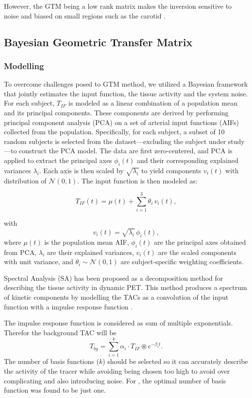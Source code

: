 However, the GTM being a low rank matrix makes the inversion sensitive to noise and biased on small regions such as the carotid \cite{zanotti2011image, boellaard2004effects}.

\subsection{Bayesian Geometric Transfer Matrix}
\subsubsection{Modelling}
To overcome challenges posed to GTM method, we utilized a Bayesian framework that jointly estimates the input function, the tissue activity and the system noise\cite{irace2021bayesian}.
For each subject, $T_{IF}$ is modeled as a linear combination of a population mean and its principal components.
These components are derived by performing principal component analysis (PCA) on a set of arterial input functions (AIFs) collected from the population.
Specifically, for each subject, a subset of 10 random subjects is selected from the dataset—excluding the subject under study—to construct the PCA model.
The data are first zero-centered, and PCA is applied to extract the principal axes \(\phi_i(t)\) and their corresponding explained variances \(\lambda_i\).
Each axis is then scaled by \(\sqrt{\lambda_i}\) to yield components \(v_i(t)\) with distribution of \(\mathcal{N}(0,1)\). The input function is then modeled as:

\begin{equation}
	T_{IF}(t) = \mu(t) + \sum_{i=1}^3 \theta_i\,v_i(t),
\end{equation}

with
\[
	v_i(t) = \sqrt{\lambda_i}\,\phi_i(t),
\]
where \(\mu(t)\) is the population mean AIF, \(\phi_i(t)\) are the principal axes obtained from PCA, \(\lambda_i\) are their explained variances, \(v_i(t)\) are the scaled components with unit variance, and \(\theta_i \sim \mathcal{N}(0,1)\) are subject-specific weighting coefficients.

Spectral Analysis (SA) has been proposed as a decomposition method for describing the tissue activity in dynamic PET.
This method produces a spectrum of kinetic components by modelling the TACs as a convolution of the input function with a impulse response function \cite{TODO}.

The impulse response function is considered as sum of multiple exponentials. Therefor the background TAC will be
\[
	T_{bg} = \sum_{i=1}^k \alpha_{i} \cdot T_{IF} \circledast e^{-\beta_{i} t}.
\]
The number of basis functions (\(k\)) should be selected so it can accurately describe the activity of the tracer while avoiding being chosen too high to avoid over complicating and also introducing noise.
For \fdg, the optimal number of basis function was found to be just one.


